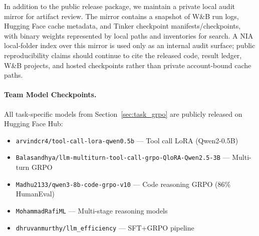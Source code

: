 In addition to the public release package, we maintain a private local audit
mirror for artifact review.  The mirror contains a snapshot of W\&B run logs,
Hugging Face cache metadata, and Tinker checkpoint manifests/checkpoints, with
binary weights represented by local paths and inventories for search.  A NIA
local-folder index over this mirror is used only as an internal audit surface;
public reproducibility claims should continue to cite the released code,
result ledger, W\&B projects, and hosted checkpoints rather than private
account-bound cache paths.

\paragraph{Team Model Checkpoints.}
All task-specific models from Section~\ref{sec:task_grpo} are publicly released
on Hugging Face Hub:
\begin{itemize}
    \item \texttt{arvindcr4/tool-call-lora-qwen0.5b} --- Tool call LoRA (Qwen2-0.5B)
    \item \texttt{Balasandhya/llm-multiturn-tool-call-grpo-QloRA-Qwen2.5-3B} --- Multi-turn GRPO
    \item \texttt{Madhu2133/qwen3-8b-code-grpo-v10} --- Code reasoning GRPO (86\% HumanEval)
    \item \texttt{MohammadRafiML} --- Multi-stage reasoning models
    \item \texttt{dhruvanmurthy/llm\_efficiency} --- SFT+GRPO pipeline
\end{itemize}



